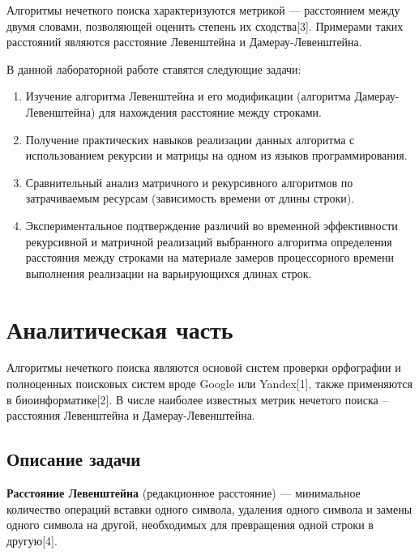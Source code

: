 \documentclass[a4paper,14pt]{article} %
\begin{document}
        \hfill
        
        Алгоритмы нечеткого поиска характеризуются метрикой — расстоянием между двумя словами, позволяющей оценить степень их сходства[3]. Примерами таких расстояний являются расстояние Левенштейна и Дамерау-Левенштейна. 
        
        \hfill
        
        В данной лабораторной работе ставятся следующие задачи:
        \begin{enumerate} 
		\item Изучение алгоритма Левенштейна и его модификации (алгоритма Дамерау-Левенштейна) для нахождения расстояние между строками. 
		\item Получение практических навыков реализации данных алгоритма с использованием рекурсии и матрицы на одном из языков программирования. 
		\item Сравнительный анализ матричного и рекурсивного алгоритмов по затрачиваемым ресурсам (зависимость времени от длины строки). 
		\item Экспериментальное подтверждение различий во временной эффективности рекурсивной и матричной реализаций выбранного алгоритма определения расстояния между строками на материале замеров процессорного времени выполнения реализации на варьирующихся длинах строк.
	\end{enumerate} 
	
	\newpage


        \section{Аналитическая часть}
        \hfill
        
        Алгоритмы нечеткого поиска являются основой систем проверки орфографии и полноценных поисковых систем вроде Google или Yandex[1], также применяются в биоинформатике[2]. В числе наиболее известных метрик нечетого поиска -- расстояния Левенштейна и Дамерау-Левенштейна. 
        
        \subsection{Описание задачи}
        \hfill
        
        \textbf{Расстояние Левенштейна}  (редакционное расстояние) — минимальное количество операций вставки одного символа, удаления одного символа и замены одного символа на другой, необходимых для превращения одной строки в другую[4].
        
\end{document}
